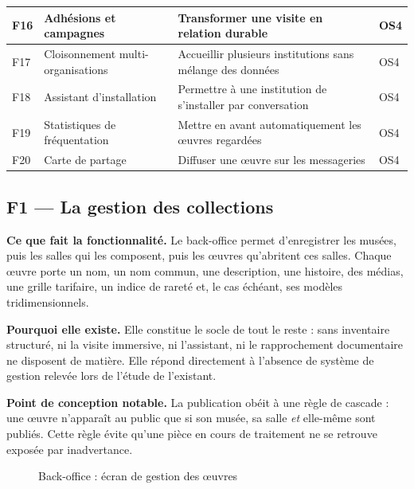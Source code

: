 \begin{table}[htbp]
\begin{tabularx}{\textwidth}{|L{1.0cm}|L{4.0cm}|X|C{1.6cm}|}
F16 & Adhésions et campagnes & Transformer une visite en relation durable & OS4 \\ \hline
F17 & Cloisonnement multi-organisations & Accueillir plusieurs institutions sans mélange des données & OS4 \\ \hline
F18 & Assistant d'installation & Permettre à une institution de s'installer par conversation & OS4 \\ \hline
F19 & Statistiques de fréquentation & Mettre en avant automatiquement les œuvres regardées & OS4 \\ \hline
F20 & Carte de partage & Diffuser une œuvre sur les messageries & OS4 \\ \hline
\end{tabularx}
\end{table}

\subsection{F1 — La gestion des collections}

\textbf{Ce que fait la fonctionnalité.} Le back-office permet d'enregistrer les
musées, puis les salles qui les composent, puis les œuvres qu'abritent ces
salles. Chaque œuvre porte un nom, un nom commun, une description, une histoire,
des médias, une grille tarifaire, un indice de rareté et, le cas échéant, ses
modèles tridimensionnels.

\textbf{Pourquoi elle existe.} Elle constitue le socle de tout le reste : sans
inventaire structuré, ni la visite immersive, ni l'assistant, ni le
rapprochement documentaire ne disposent de matière. Elle répond directement à
l'absence de système de gestion relevée lors de l'étude de l'existant.

\textbf{Point de conception notable.} La publication obéit à une règle de
cascade : une œuvre n'apparaît au public que si son musée, sa salle \emph{et}
elle-même sont publiés. Cette règle évite qu'une pièce en cours de traitement
ne se retrouve exposée par inadvertance.

\begin{figure}[htbp]
\centering
{}
\caption{Back-office : écran de gestion des œuvres}
\label{fig:cap-objets}
\end{figure}

